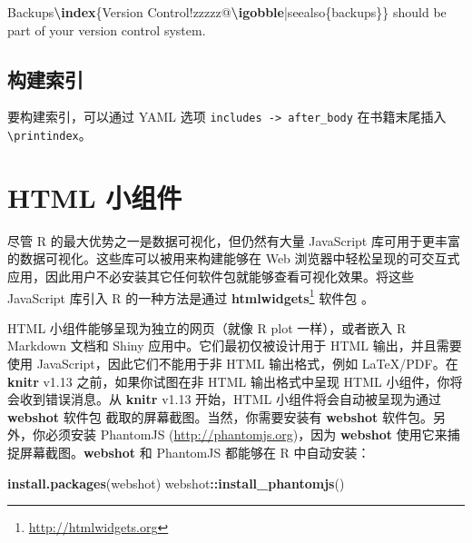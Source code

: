 \documentclass[
  12pt,
]{krantz}
\newenvironment{Shaded}{\begin{snugshade}}{\end{snugshade}}
\newcommand{\FunctionTok}[1]{\textcolor[rgb]{0.13,0.29,0.53}{\textbf{#1}}}
\newcommand{\NormalTok}[1]{#1}
\newcommand{\SpecialCharTok}[1]{\textcolor[rgb]{0.81,0.36,0.00}{\textbf{#1}}}
\newcommand{\StringTok}[1]{\textcolor[rgb]{0.31,0.60,0.02}{#1}}
\renewcommand{\href}[2]{#2\footnote{\url{#1}}}
\theoremstyle{definition}
\theoremstyle{definition}
\theoremstyle{definition}
\theoremstyle{definition}
\theoremstyle{remark}
\begin{document}
\begin{Shaded}
\begin{Highlighting}[]
\NormalTok{Backups}\FunctionTok{\textbackslash{}index}\NormalTok{\{Version Control!zzzzz@}\FunctionTok{\textbackslash{}igobble}\NormalTok{|seealso\{backups\}\}}
\NormalTok{should be part of your version control system.}
\end{Highlighting}
\end{Shaded}

\hypertarget{ux6784ux5efaux7d22ux5f15}{%
\subsection{构建索引}\label{ux6784ux5efaux7d22ux5f15}}

要构建索引，可以通过 YAML 选项 \texttt{includes\ -\textgreater{}\ after\_body} 在书籍末尾插入 \texttt{\textbackslash{}printindex}。

\hypertarget{html-ux5c0fux7ec4ux4ef6}{%
\section{HTML 小组件}\label{html-ux5c0fux7ec4ux4ef6}}

尽管 R 的最大优势之一是数据可视化，但仍然有大量 JavaScript 库可用于更丰富的数据可视化。这些库可以被用来构建能够在 Web 浏览器中轻松呈现的可交互式应用，因此用户不必安装其它任何软件包就能够查看可视化效果。将这些 JavaScript 库引入 R 的一种方法是通过 \href{http://htmlwidgets.org}{\textbf{htmlwidgets}} 软件包 \citep{R-htmlwidgets}。

HTML 小组件能够呈现为独立的网页（就像 R plot 一样），或者嵌入 R Markdown 文档和 Shiny 应用中。它们最初仅被设计用于 HTML 输出，并且需要使用 JavaScript，因此它们不能用于非 HTML 输出格式，例如 LaTeX/PDF。在 \textbf{knitr} v1.13 之前，如果你试图在非 HTML 输出格式中呈现 HTML 小组件，你将会收到错误消息。从 \textbf{knitr} v1.13 开始，HTML 小组件将会自动被呈现为通过 \textbf{webshot} 软件包 \citep{R-webshot} 截取的屏幕截图。当然，你需要安装有 \textbf{webshot} 软件包。另外，你必须安装 PhantomJS (\url{http://phantomjs.org})，因为 \textbf{webshot} 使用它来捕捉屏幕截图。\textbf{webshot} 和 PhantomJS 都能够在 R 中自动安装：

\begin{Shaded}
\begin{Highlighting}[]
\FunctionTok{install.packages}\NormalTok{(}\StringTok{\textquotesingle{}webshot\textquotesingle{}}\NormalTok{)}
\NormalTok{webshot}\SpecialCharTok{::}\FunctionTok{install\_phantomjs}\NormalTok{()}
\end{Highlighting}
\end{Shaded}
\end{document}

